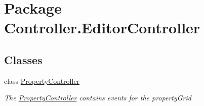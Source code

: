\hypertarget{namespace_controller_1_1_editor_controller}{\section{Package Controller.\-Editor\-Controller}
\label{namespace_controller_1_1_editor_controller}
}
\subsection*{Classes}
\begin{DoxyCompactItemize}
\item 
class \hyperlink{class_controller_1_1_editor_controller_1_1_property_controller}{Property\-Controller}
\begin{DoxyCompactList}\small\item\em The \hyperlink{class_controller_1_1_editor_controller_1_1_property_controller}{Property\-Controller} contains events for the property\-Grid \end{DoxyCompactList}\end{DoxyCompactItemize}
